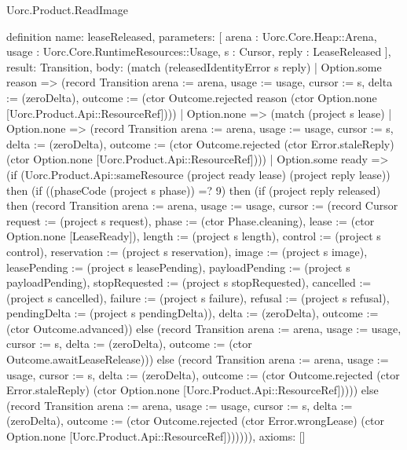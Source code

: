 \begin{lexlean}{Uorc.Product.ReadImage}
\begin{semanticmodule}
definition{
  name: leaseReleased,
  parameters: [
    arena : Uorc.Core.Heap::Arena,
    usage : Uorc.Core.RuntimeResources::Usage,
    s : Cursor,
    reply : LeaseReleased
  ],
  result: Transition,
  body: (match (releasedIdentityError s reply)
    | Option.some reason => (record Transition {arena := arena, usage := usage, cursor := s, delta := (zeroDelta), outcome := (ctor Outcome.rejected reason (ctor Option.none [Uorc.Product.Api::ResourceRef]))})
    | Option.none => (match (project s lease)
      | Option.none => (record Transition {arena := arena, usage := usage, cursor := s, delta := (zeroDelta), outcome := (ctor Outcome.rejected (ctor Error.staleReply) (ctor Option.none [Uorc.Product.Api::ResourceRef]))})
      | Option.some ready => (if (Uorc.Product.Api::sameResource (project ready lease) (project reply lease)) then (if ((phaseCode (project s phase)) =? 9) then (if (project reply released) then (record Transition {arena := arena, usage := usage, cursor := (record Cursor {request := (project s request), phase := (ctor Phase.cleaning), lease := (ctor Option.none [LeaseReady]), length := (project s length), control := (project s control), reservation := (project s reservation), image := (project s image), leasePending := (project s leasePending), payloadPending := (project s payloadPending), stopRequested := (project s stopRequested), cancelled := (project s cancelled), failure := (project s failure), refusal := (project s refusal), pendingDelta := (project s pendingDelta)}), delta := (zeroDelta), outcome := (ctor Outcome.advanced)}) else (record Transition {arena := arena, usage := usage, cursor := s, delta := (zeroDelta), outcome := (ctor Outcome.awaitLeaseRelease)})) else (record Transition {arena := arena, usage := usage, cursor := s, delta := (zeroDelta), outcome := (ctor Outcome.rejected (ctor Error.staleReply) (ctor Option.none [Uorc.Product.Api::ResourceRef]))})) else (record Transition {arena := arena, usage := usage, cursor := s, delta := (zeroDelta), outcome := (ctor Outcome.rejected (ctor Error.wrongLease) (ctor Option.none [Uorc.Product.Api::ResourceRef]))})))),
  axioms: []
}


\end{semanticmodule}
\end{lexlean}

